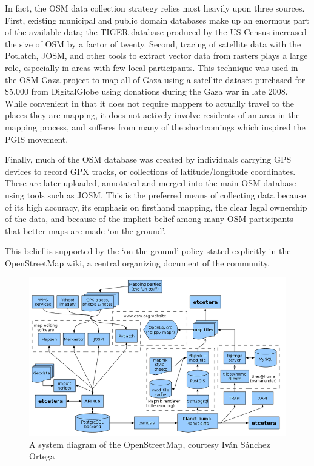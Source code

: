 \documentclass[11pt,oneside,notitlepage]{report}
\begin{document}
In fact, the OSM data collection strategy relies most heavily upon three sources. First, existing municipal and public domain databases make up an enormous part of the available data; the TIGER database produced by the US Census increased the size of OSM by a factor of twenty. \cite{willis2007osm} Second, tracing of satellite data with the Potlatch, \ac{JOSM}, and other tools to extract vector data from rasters plays a large role, especially in areas with few local participants. This technique was used in the OSM Gaza project to map all of Gaza using a satellite dataset purchased for \$5,000 from DigitalGlobe using donations during the Gaza war in late 2008. \cite{maron2010openstreetmap}\cite{chilton-crowdsourcing} While convenient in that it does not require mappers to actually travel to the places they are mapping, it does not actively involve residents of an area in the mapping process, and sufferes from many of the shortcomings which inspired the \ac{PGIS} movement. 

Finally, much of the OSM database was created by individuals carrying GPS devices to record GPX tracks, or collections of latitude/longitude coordinates. These are later uploaded, annotated and merged into the main OSM database using tools such as \ac{JOSM}. This is the preferred means of collecting data because of its high accuracy, its emphasis on firsthand mapping, the clear legal ownership of the data, and because of the implicit belief among many OSM participants that better maps are made `on the ground'. 

This belief is supported by the `on the ground' policy stated explicitly in the OpenStreetMap wiki, a central organizing document of the community.

\begin{figure}[h]
  \begin{center}
    \includegraphics[scale=0.45]{images/osm-diagram.png}
    \caption{A system diagram of the OpenStreetMap, courtesy Iv\'{a}n S\'{a}nchez Ortega}
  \end{center}
\end{figure}
\end{document}
